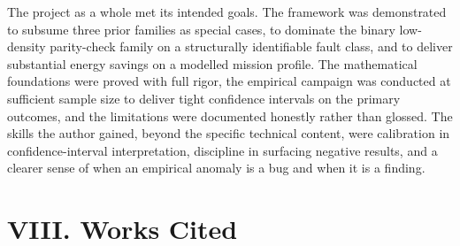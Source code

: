 \documentclass[12pt,a4paper]{article}
\theoremstyle{plain}
\theoremstyle{definition}
\begin{document}
The project as a whole met its intended goals. The framework was demonstrated to subsume three prior families as special cases, to dominate the binary low-density parity-check family on a structurally identifiable fault class, and to deliver substantial energy savings on a modelled mission profile. The mathematical foundations were proved with full rigor, the empirical campaign was conducted at sufficient sample size to deliver tight confidence intervals on the primary outcomes, and the limitations were documented honestly rather than glossed. The skills the author gained, beyond the specific technical content, were calibration in confidence-interval interpretation, discipline in surfacing negative results, and a clearer sense of when an empirical anomaly is a bug and when it is a finding.

\section{VIII. Works Cited}
\end{document}
